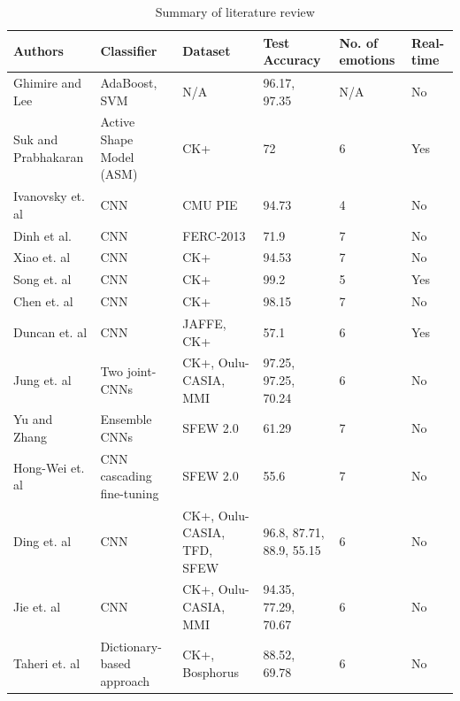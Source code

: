 \documentclass[master]{thesis-uestc}
\begin{document}
\begin{center}
\begin{table}
\caption{\,\,\,\,\,Summary of literature review}
\begin{tabular}{ | m{5em} | m{3cm}| m{2cm} | m{2cm} | m{2cm} | m{2cm} | } 
\hline
\textbf{Authors} & \textbf{Classifier} & \textbf{Dataset} & \textbf{Test Accuracy} & \textbf{No. of emotions} & \textbf{Real-time}\\ 
\hline
Ghimire and Lee\cite{ghimire2013} & AdaBoost, SVM & N/A & 96.17, 97.35 & N/A & No\\
\hline
Suk and Prabhakaran\cite{MSu14} & Active Shape Model (ASM) & CK+ & 72 & 6 & Yes \\ 
\hline
Ivanovsky et. al\cite{Ivanovsky-2017} & CNN & CMU PIE & 94.73 & 4 & No \\
\hline
Dinh et al.\cite{sang-2017} & CNN & FERC-2013 & 71.9 & 7 & No \\
\hline
Xiao et. al\cite{8273609} & CNN & CK+ & 94.53 & 7 & No \\
\hline
Song et. al\cite{6776135} & CNN & CK+ & 99.2 & 5 & Yes \\
\hline
Chen et. al\cite{7988558} & CNN & CK+ & 98.15 & 7 & No \\
\hline
Duncan et. al\cite{duncan2016} & CNN & JAFFE, CK+ & 57.1 & 6 & Yes \\
\hline
Jung et. al\cite{7410698} & Two joint-CNNs & CK+, Oulu-CASIA, MMI & 97.25, 97.25, 70.24 & 6 & No \\
\hline
Yu and Zhang\cite{Yu:2015:IBS:2818346.2830595} & Ensemble CNNs & SFEW 2.0 & 61.29 & 7 & No \\
\hline
Hong-Wei et. al\cite{Ng:2015:DLE:2818346.2830593} & CNN cascading fine-tuning & SFEW 2.0 & 55.6 & 7 & No \\
\hline
Ding et. al\cite{7961731} & CNN & CK+, Oulu-CASIA, TFD, SFEW & 96.8, 87.71, 88.9, 55.15 & 6 & No \\
\hline
Jie et. al\cite{8373844} & CNN & CK+, Oulu-CASIA, MMI & 94.35, 77.29, 70.67 & 6 & No \\
\hline
Taheri et. al\cite{6837526} & Dictionary-based approach & CK+, Bosphorus & 88.52, 69.78 & 6 & No \\
\hline
\end{tabular}
\label{summ_literature}
\end{table}
\end{center}
\end{document}
